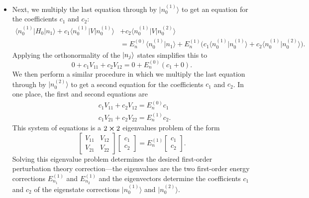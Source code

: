 \documentclass[11pt, a4paper]{article}
\newcommand{\bket}[1]{\big | {#1} \big \rangle }
\newcommand{\bbraket}[2]{\big \langle {#1} \big | {#2} \big \rangle}  %
\newcommand{\bmel}[3]{\big \langle {#1} \big | {#2} \big | {#3} \big \rangle}  %
\begin{document}
\begin{itemize}
    \item Next, we multiply the last equation through by $ \bket{n_{0}^{(1)}} $ to get an equation for the coefficients $ c_{1} $ and $ c_{2} $:
    \begin{align*}
        \bmel{n_{0}^{(1)}}{H_{0}}{n_{1}} + c_{1}\bmel{n_{0}^{(1)}}{V}{n_{0}^{(1)}} &+ c_{2}\bmel{n_{0}^{(1)}}{V}{n_{0}^{(2)}} \\
        & = E_{n}^{(0)} \bbraket{n_{0}^{(1)}}{n_{1}} + E_{n}^{(1)}\big( c_{1}\bbraket{n_{0}^{(1)}}{n_{0}^{(1)}} + c_{2} \bbraket{n_{0}^{(1)}}{n_{0}^{(2)}} \big).
    \end{align*}
    Applying the orthonormality of the $ \ket{n_{j}} $ states simplifies this to
    \begin{equation*}
        0 + c_{1}V_{11} + c_{2}V_{12} = 0 + E_{n}^{(0)}(c_{1} + 0).
    \end{equation*}
    We then perform a similar procedure in which we multiply the last equation through by $ \bket{n_{0}^{(2)}} $ to get a second equation for the coefficients $ c_{1} $ and $ c_{2} $. In one place, the first and second equations are
    \begin{align*}
        & c_{1}V_{11} + c_{2}V_{12} = E_{n}^{(0)} c_{1}\\
        & c_{1}V_{21} + c_{2}V_{22} = E_{n}^{(1)} c_{2}.
    \end{align*}
    This system of equations is a $ 2 \cross 2 $ eigenvalues problem of the form
    \begin{equation*}
        \begin{bmatrix}
            V_{11} & V_{12}\\
            V_{21} & V_{22}
        \end{bmatrix}
        \begin{bmatrix}
            c_{1}\\
            c_{2}
        \end{bmatrix}
        = E_{n}^{(1)}
        \begin{bmatrix}
            c_{1}\\
            c_{2}
        \end{bmatrix}.
    \end{equation*}
    Solving this eigenvalue problem determines the desired first-order perturbation theory correction---the eigenvalues are the two first-order energy corrections $ E_{n_{1}}^{(1)} $ and $ E_{n_{2}}^{(1)} $ and the eigenvectors determine the coefficients $ c_{1} $ and $ c_{2} $ of the eigenstate corrections $ \bket{n_{0}^{(1)}} $ and $ \bket{n_{0}^{(2)}} $. 
\end{itemize}
\end{document}
